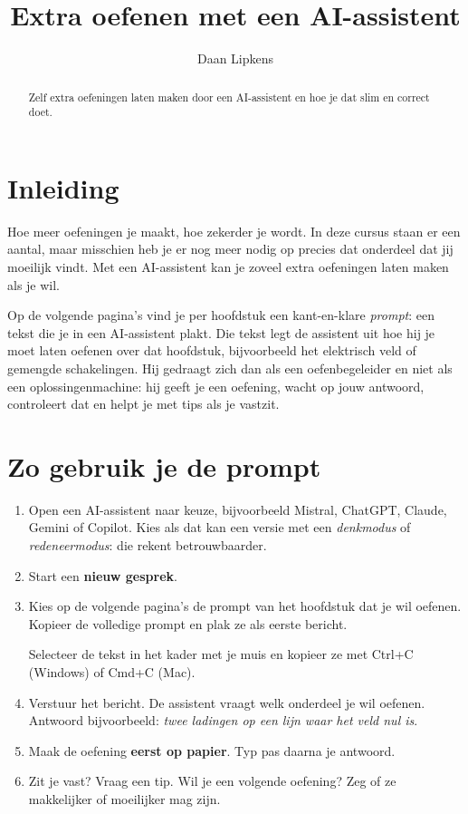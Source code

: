 \documentclass{ximera}
\title{Extra oefenen met een AI-assistent}
\author{Daan Lipkens}
\begin{document}
\begin{abstract}
    Zelf extra oefeningen  laten maken door een AI-assistent en hoe je dat slim en correct doet.
\end{abstract}
\maketitle
\label{hoofdstuk:ai_oefenen}

\section*{Inleiding}
Hoe meer oefeningen je maakt, hoe zekerder je wordt. In deze cursus staan er een aantal, maar misschien heb je er nog meer nodig op precies dat onderdeel dat jij moeilijk vindt. Met een AI-assistent kan je zoveel extra oefeningen laten maken als je wil.

Op de volgende pagina's vind je per hoofdstuk een kant-en-klare \emph{prompt}: een tekst die je in een AI-assistent plakt. Die tekst legt de assistent uit hoe hij je moet laten oefenen over dat hoofdstuk, bijvoorbeeld het elektrisch veld of gemengde schakelingen. Hij gedraagt zich dan als een oefenbegeleider en niet als een oplossingenmachine: hij geeft je een oefening, wacht op jouw antwoord, controleert dat en helpt je met tips als je vastzit.

\section{Zo gebruik je de prompt}\label{sec:ai-gebruik}
\begin{enumerate}
    \item Open een AI-assistent naar keuze, bijvoorbeeld Mistral, ChatGPT, Claude, Gemini of Copilot. Kies als dat kan een versie met een \emph{denkmodus} of \emph{redeneermodus}: die rekent betrouwbaarder.
    \item Start een \textbf{nieuw gesprek}.
    \item Kies op de volgende pagina's de prompt van het hoofdstuk dat je wil oefenen. Kopieer de volledige prompt en plak ze als eerste bericht.
    \begin{onlineOnly}
        Selecteer de tekst in het kader met je muis en kopieer ze met Ctrl+C (Windows) of Cmd+C (Mac).
    \end{onlineOnly}
    \item Verstuur het bericht. De assistent vraagt welk onderdeel je wil oefenen. Antwoord bijvoorbeeld: \emph{twee ladingen op een lijn waar het veld nul is}.
    \item Maak de oefening \textbf{eerst op papier}. Typ pas daarna je antwoord.
    \item Zit je vast? Vraag een tip. Wil je een volgende oefening? Zeg of ze makkelijker of moeilijker mag zijn.
\end{enumerate}
\end{document}
